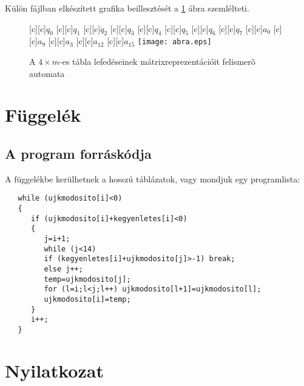 \documentclass[12pt]{report}
\theoremstyle{definition}
\begin{document}
\newpage

Külön fájlban elkészített grafika beillesztését a \ref{abra-automata} ábra szemlélteti.
\begin{figure}[h]
\centering
[c][c]{$q_0$}
[c][c]{$q_1$}
[c][c]{$q_2$}
[c][c]{$q_3$}
[c][c]{$q_4$}
[c][c]{$q_5$}
[c][c]{$q_6$}
[c][c]{$q_7$}
[c][c]{$a_{0}$}
[c][c]{$a_{9}$}
[c][c]{$a_{3}$}
[c][c]{$a_{12}$}
[c][c]{$a_{15}$}
\texttt{[image: abra.eps]}
\caption{\label{abra-automata} A $4\times m$-es tábla lefedéseinek mátrixreprezentációit felismerõ automata}
\end{figure}


\chapter{Függelék}

\section{A program forráskódja}
A függelékbe kerülhetnek a hosszú táblázatok, vagy mondjuk egy programlista:
\begin{verbatim}
   while (ujkmodosito[i]<0)
   {
      if (ujkmodosito[i]+kegyenletes[i]<0)
      {
         j=i+1;
         while (j<14)
         if (kegyenletes[i]+ujkmodosito[j]>-1) break;
         else j++;
         temp=ujkmodosito[j];
         for (l=i;l<j;l++) ujkmodosito[l+1]=ujkmodosito[l];
         ujkmodosito[i]=temp;
      }
      i++;
   }
\end{verbatim}


\chapter*{Nyilatkozat}

\end{document}
